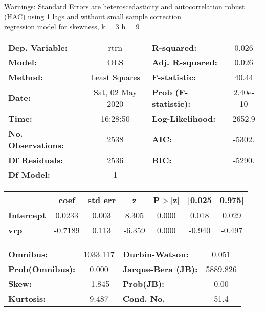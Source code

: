 Warnings: \newline
 [1] Standard Errors are heteroscedasticity and autocorrelation robust (HAC) using 1 lags and without small sample correction\\ 

regression model for skewness, k = 3 h = 9\begin{center}
\begin{tabular}{lclc}
\toprule
\textbf{Dep. Variable:}    &       rtrn       & \textbf{  R-squared:         } &     0.026   \\
\textbf{Model:}            &       OLS        & \textbf{  Adj. R-squared:    } &     0.026   \\
\textbf{Method:}           &  Least Squares   & \textbf{  F-statistic:       } &     40.44   \\
\textbf{Date:}             & Sat, 02 May 2020 & \textbf{  Prob (F-statistic):} &  2.40e-10   \\
\textbf{Time:}             &     16:28:50     & \textbf{  Log-Likelihood:    } &    2652.9   \\
\textbf{No. Observations:} &        2538      & \textbf{  AIC:               } &    -5302.   \\
\textbf{Df Residuals:}     &        2536      & \textbf{  BIC:               } &    -5290.   \\
\textbf{Df Model:}         &           1      & \textbf{                     } &             \\
\bottomrule
\end{tabular}
\begin{tabular}{lcccccc}
                   & \textbf{coef} & \textbf{std err} & \textbf{z} & \textbf{P$> |$z$|$} & \textbf{[0.025} & \textbf{0.975]}  \\
\midrule
\textbf{Intercept} &       0.0233  &        0.003     &     8.305  &         0.000        &        0.018    &        0.029     \\
\textbf{vrp}       &      -0.7189  &        0.113     &    -6.359  &         0.000        &       -0.940    &       -0.497     \\
\bottomrule
\end{tabular}
\begin{tabular}{lclc}
\textbf{Omnibus:}       & 1033.117 & \textbf{  Durbin-Watson:     } &    0.051  \\
\textbf{Prob(Omnibus):} &   0.000  & \textbf{  Jarque-Bera (JB):  } & 5889.826  \\
\textbf{Skew:}          &  -1.845  & \textbf{  Prob(JB):          } &     0.00  \\
\textbf{Kurtosis:}      &   9.487  & \textbf{  Cond. No.          } &     51.4  \\
\bottomrule
\end{tabular}
\end{center}

